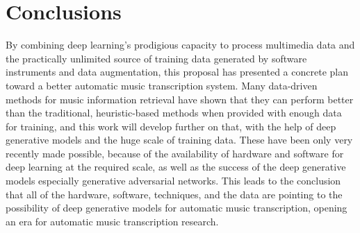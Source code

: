 
\graphicspath{{7-conclusions/figures/}}

\chapter{Conclusions}
\label{ch:conclusions}

By combining deep learning's prodigious capacity to process multimedia data and the practically unlimited source of training data generated by software instruments and data augmentation, this proposal has presented a concrete plan toward a better automatic music transcription system.
Many data-driven methods for music information retrieval have shown that they can perform better than the traditional, heuristic-based methods when provided with enough data for training, and this work will develop further on that, with the help of deep generative models and the huge scale of training data.
These have been only very recently made possible, because of the availability of hardware and software for deep learning at the required scale, as well as the success of the deep generative models especially generative adversarial networks.
This leads to the conclusion that all of the hardware, software, techniques, and the data are pointing to the possibility of deep generative models for automatic music transcription, opening an era for automatic music transcription research.

